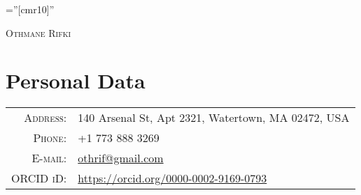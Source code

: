 \documentclass[a4paper,10pt]{article}
\begin{document}

\pagestyle{empty} %

\font\fb=''[cmr10]'' %

\par{\centering
		{\Huge \textsc{Othmane Rifki}
	}\bigskip\par}

\section{Personal Data}

\begin{tabular}{rl}
    \textsc{Address:}   					& 140 Arsenal St, Apt 2321, Watertown, MA 02472, USA \\
    \textsc{Phone:}     				    & +1 773 888 3269				            \\
    \textsc{E-mail:}     					& \href{mailto:othrif@gmail.com}{othrif@gmail.com}	\\
    \textsc{ORCID iD:}						& \href{https://orcid.org/0000-0002-9169-0793}{https://orcid.org/0000-0002-9169-0793}
\end{tabular}


\vspace{3mm}
\end{document}

